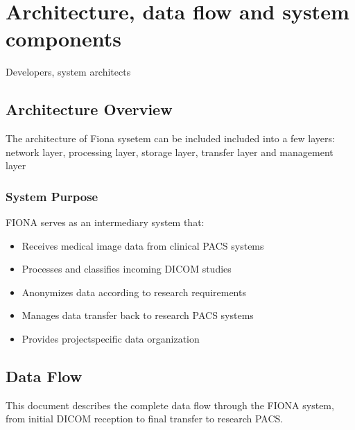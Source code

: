 \documentclass[letterpaper,10pt,english]{sphinxmanual}
\begin{document}
\sphinxstepscope


\chapter{Architecture, data flow and system components}
\label{\detokenize{Architecture/index:architecture-data-flow-and-system-components}}\label{\detokenize{Architecture/index::doc}}
\sphinxAtStartPar
{} Developers, system architects

\sphinxstepscope


\section{Architecture Overview}
\label{\detokenize{Architecture/overview:architecture-overview}}\label{\detokenize{Architecture/overview::doc}}
\sphinxAtStartPar
The architecture of Fiona sysetem can be included included into a few layers: network layer, processing layer, storage layer, transfer layer and management layer



\subsection{System Purpose}
\label{\detokenize{Architecture/overview:system-purpose}}
\sphinxAtStartPar
FIONA serves as an intermediary system that:
\begin{itemize}
\item {} 
\sphinxAtStartPar
Receives medical image data from clinical PACS systems

\item {} 
\sphinxAtStartPar
Processes and classifies incoming DICOM studies

\item {} 
\sphinxAtStartPar
Anonymizes data according to research requirements

\item {} 
\sphinxAtStartPar
Manages data transfer back to research PACS systems

\item {} 
\sphinxAtStartPar
Provides project\sphinxhyphen{}specific data organization

\end{itemize}

\sphinxstepscope


\section{Data Flow}
\label{\detokenize{Architecture/data-flow:data-flow}}\label{\detokenize{Architecture/data-flow::doc}}
\sphinxAtStartPar
This document describes the complete data flow through the FIONA system, from initial DICOM reception to final transfer to research PACS.
\end{document}

